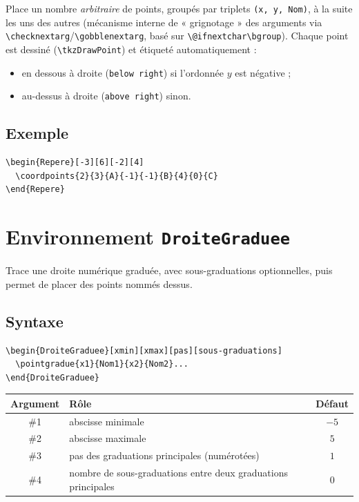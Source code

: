 \documentclass[11pt,a4paper]{article}
\newcommand{\cmdname}[1]{\texttt{\textbackslash#1}}
\begin{document}
Place un nombre \emph{arbitraire} de points, groupés par triplets \texttt{(x, y, Nom)}, à la suite les uns des autres (mécanisme interne de « grignotage » des arguments via \cmdname{checknextarg}/\cmdname{gobblenextarg}, basé sur \texttt{\textbackslash @ifnextchar\textbackslash bgroup}). Chaque point est dessiné (\texttt{\textbackslash tkzDrawPoint}) et étiqueté automatiquement :
\begin{itemize}
  \item en dessous à droite (\texttt{below right}) si l'ordonnée $y$ est négative ;
  \item au-dessus à droite (\texttt{above right}) sinon.
\end{itemize}

\subsection{Exemple}

\begin{lstlisting}
\begin{Repere}[-3][6][-2][4]
  \coordpoints{2}{3}{A}{-1}{-1}{B}{4}{0}{C}
\end{Repere}
\end{lstlisting}

\section{Environnement \texttt{DroiteGraduee}}

Trace une droite numérique graduée, avec sous-graduations optionnelles, puis permet de placer des points nommés dessus.

\subsection{Syntaxe}

\begin{lstlisting}
\begin{DroiteGraduee}[xmin][xmax][pas][sous-graduations]
  \pointgradue{x1}{Nom1}{x2}{Nom2}...
\end{DroiteGraduee}
\end{lstlisting}

\begin{center}
\begin{tabular}{@{}clc@{}}
\toprule
\textbf{Argument} & \textbf{Rôle} & \textbf{Défaut} \\
\midrule
\#1 & abscisse minimale & $-5$ \\
\#2 & abscisse maximale & $5$ \\
\#3 & pas des graduations principales (numérotées) & $1$ \\
\#4 & nombre de sous-graduations entre deux graduations principales & $0$ \\
\bottomrule
\end{tabular}
\end{center}
\end{document}
